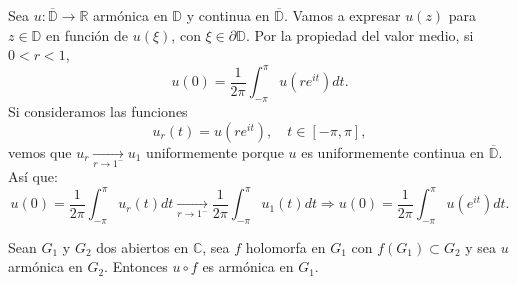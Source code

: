 Sea $u: \overline{\mathbb{D}} \to \mathbb{R}$ armónica en $\mathbb{D}$ y continua en $\overline{\mathbb{D}}$.
Vamos a expresar $u(z)$ para $z \in \mathbb{D}$ en función de $u(\xi)$, con $\xi \in \partial\mathbb{D}$.
Por la propiedad del valor medio, si $0 < r < 1$,
$$u(0) = \frac{1}{2\pi} \int_{-\pi}^\pi u(re^{it})dt.$$
Si consideramos las funciones
$$u_r(t) = u(re^{it}), \quad t \in [-\pi, \pi],$$
vemos que $u_r \xrightarrow[r \to 1^-]{} u_1$ uniformemente porque $u$ es uniformemente continua en $\overline{\mathbb{D}}$.
Así que:
$$u(0) = \frac{1}{2\pi} \int_{-\pi}^\pi u_r(t)dt \xrightarrow[r \to 1^-]{} \frac{1}{2\pi} \int_{-\pi}^\pi u_1(t)dt \Rightarrow u(0) = \frac{1}{2\pi} \int_{-\pi}^\pi u(e^{it})dt.$$

\begin{lemma}
    Sean $G_1$ y $G_2$ dos abiertos en $\mathbb{C}$, sea $f$ holomorfa en $G_1$ con $f(G_1) \subset G_2$ y sea $u$ armónica en $G_2$.
    Entonces $u \circ f$ es armónica en $G_1$.
\end{lemma}

